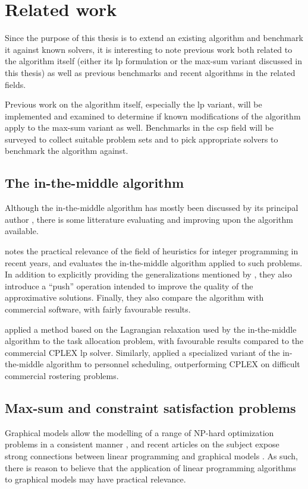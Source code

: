 \section{Related work}
Since the purpose of this thesis is to extend an existing algorithm and benchmark it against known solvers, it is interesting to note previous work both related to the algorithm itself (either its \gls{lp} formulation or the max-sum variant discussed in this thesis) as well as previous benchmarks and recent algorithms in the related fields.

Previous work on the algorithm itself, especially the \gls{lp} variant, will be implemented and examined to determine if known modifications of the algorithm apply to the max-sum variant as well.
Benchmarks in the \gls{csp} field will be surveyed to collect suitable problem sets and to pick appropriate solvers to benchmark the algorithm against.

\subsection{The in-the-middle algorithm}
Although the in-the-middle algorithm has mostly been discussed by its principal author \parencites{Wedelin95}{Wedelin08}{Wedelin13}{Alefragis00}, there is some litterature evaluating and improving upon the algorithm available.

\Textcite{Bastert10} notes the practical relevance of the field of heuristics for integer programming in recent years, and evaluates the in-the-middle algorithm applied to such problems. In addition to explicitly providing the generalizations mentioned by \textcite{Wedelin95}, they also introduce a \enquote{push} operation intended to improve the quality of the approximative solutions. Finally, they also compare the algorithm with commercial software, with fairly favourable results.

\Textcite{Ernst05} applied a method based on the Lagrangian relaxation used by the in-the-middle algorithm to the task allocation problem, with favourable results compared to the commercial CPLEX \gls{lp} solver.
Similarly, \textcite{Mason01} applied a specialized variant of the in-the-middle algorithm to personnel scheduling, outperforming CPLEX on difficult commercial rostering problems.

\subsection{Max-sum and constraint satisfaction problems}
Graphical models allow the modelling of a range of NP-hard optimization problems in a consistent manner \parencite{deGivry14}, and recent articles on the subject expose strong connections between linear programming and graphical models \parencites{Werner07}{Kolmogorov13}.
As such, there is reason to believe that the application of linear programming algorithms to graphical models may have practical relevance.

